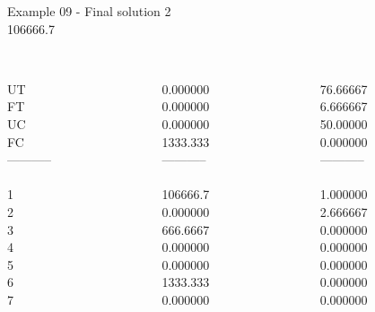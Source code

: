 \begin{frame}{Example 09 - Final solution}
\footnotesize
{} 2 \\
  106666.7\\

\begin{columns}[t]
\begin{column}{0.3\textwidth}
\\
UT\\
FT\\
UC\\
FC\\
-----------\\
\\
1\\
2\\
3\\
4\\
5\\
6\\
7\\

\end{column}
\begin{column}{0.3\textwidth}
\\
0.000000\\
0.000000\\
0.000000\\
1333.333\\

-----------\\
\\
106666.7\\
0.000000\\
666.6667\\
0.000000\\
0.000000\\
1333.333\\
0.000000\\

\end{column}  

\begin{column}{0.3\textwidth}
\\
76.66667\\
6.666667\\
50.00000\\
0.000000\\


-----------\\
\\
1.000000\\
2.666667\\
0.000000\\
0.000000\\
0.000000\\
0.000000\\
0.000000\\

\end{column}
\end{columns}  
\end{frame}
